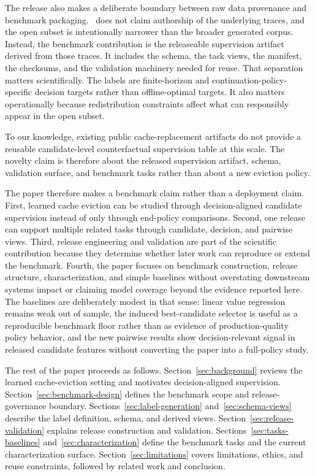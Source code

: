 The release also makes a deliberate boundary between raw data provenance and benchmark packaging. \lafc\ does not claim authorship of the underlying traces, and the open subset is intentionally narrower than the broader generated corpus. Instead, the benchmark contribution is the releaseable supervision artifact derived from those traces. It includes the schema, the task views, the manifest, the checksums, and the validation machinery needed for reuse. That separation matters scientifically. The labels are finite-horizon and continuation-policy-specific decision targets rather than offline-optimal targets. It also matters operationally because redistribution constraints affect what can responsibly appear in the open subset.

To our knowledge, existing public cache-replacement artifacts do not provide a reusable candidate-level counterfactual supervision table at this scale. The novelty claim is therefore about the released supervision artifact, schema, validation surface, and benchmark tasks rather than about a new eviction policy.

\begin{sloppypar}
The paper therefore makes a benchmark claim rather than a deployment claim. First, learned cache eviction can be studied through decision-aligned candidate supervision instead of only through end-policy comparisons. Second, one release can support multiple related tasks through candidate, decision, and pairwise views. Third, release engineering and validation are part of the scientific contribution because they determine whether later work can reproduce or extend the benchmark. Fourth, the paper focuses on benchmark construction, release structure, characterization, and simple baselines without overstating downstream systems impact or claiming model coverage beyond the evidence reported here. The baselines are deliberately modest in that sense: linear value regression remains weak out of sample, the induced best-candidate selector is useful as a reproducible benchmark floor rather than as evidence of production-quality policy behavior, and the new pairwise results show decision-relevant signal in released candidate features without converting the paper into a full-policy study.
\end{sloppypar}

The rest of the paper proceeds as follows. Section~\ref{sec:background} reviews the learned cache-eviction setting and motivates decision-aligned supervision. Section~\ref{sec:benchmark-design} defines the benchmark scope and release-governance boundary. Sections~\ref{sec:label-generation} and~\ref{sec:schema-views} describe the label definition, schema, and derived views. Section~\ref{sec:release-validation} explains release construction and validation. Sections~\ref{sec:tasks-baselines} and~\ref{sec:characterization} define the benchmark tasks and the current characterization surface. Section~\ref{sec:limitations} covers limitations, ethics, and reuse constraints, followed by related work and conclusion.
